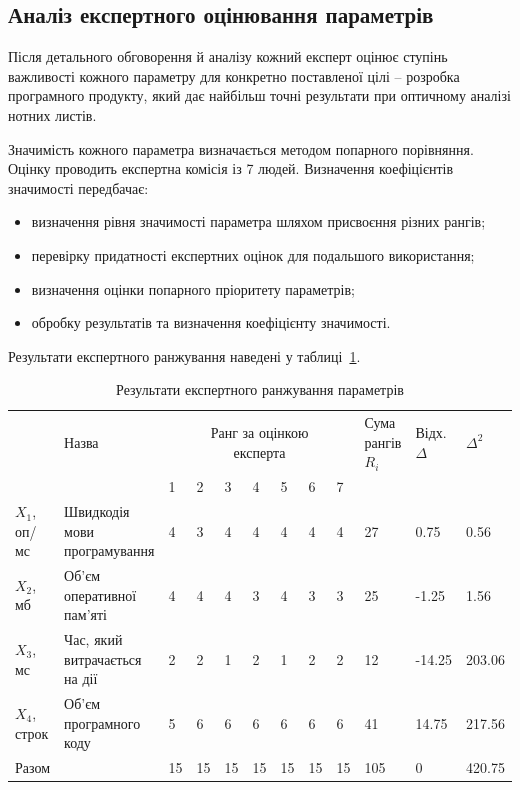 \subsection{Аналіз експертного оцінювання параметрів}
Після детального обговорення й аналізу кожний експерт оцінює ступінь важливості кожного 
параметру для конкретно поставленої цілі – розробка програмного продукту, який дає найбільш 
точні результати при оптичному аналізі нотних листів.

Значимість кожного параметра визначається методом попарного порівняння. Оцінку проводить експертна комісія із 7 людей. Визначення коефіцієнтів значимості передбачає: 
\begin{itemize}
	\item визначення рівня значимості параметра шляхом присвоєння різних рангів; 
	\item перевірку придатності експертних оцінок для подальшого використання; 
	\item визначення оцінки попарного пріоритету параметрів; 
	\item обробку результатів та визначення коефіцієнту значимості. 
\end{itemize}

Результати експертного ранжування наведені у таблиці~\ref{tab:economics:parameter_range}.

\begin{table}[H]
	\caption{Результати експертного ранжування параметрів}
	\centering
	\begin{tabular}{| m{} | p{} | m{} | m{} | m{} | m{} | m{} | m{} | m{} |	p{}|p{}|p{}|}
	\hline
	\multirow{2}{*}{\rotatebox{90}{Позначення  }} & Назва & \multicolumn{7}{c|}{\parbox[c]{0.3\textwidth}{Ранг за оцінкою\\експерта}} 	& Сума рангів $R_i$ & Відх. $\Delta$ &$\Delta^2 $ \\
	\cline{3-9}
			   & 	   & 1& 2& 3& 4& 5& 6& 7							&					&					&\\ 
	\hline
	$X_1$, оп/мс & Швидкодія мови програмування 	& 4& 3& 4& 4& 4& 4& 4& 27& 0.75 	& 0.56 \\
	\hline
	$X_2$, мб	& Об'єм оперативної пам'яті 	& 4& 4& 4& 3& 4& 3& 3& 25&-1.25	& 1.56 \\ 
	\hline
	$X_3$, мс	& Час, який витрачається на дії		& 2& 2& 1& 2& 1& 2& 2& 12&-14.25& 203.06\\
	\hline
	$X_4$, строк & Об'єм програмного коду		& 5& 6& 6& 6& 6& 6& 6& 41& 14.75& 217.56\\
	\hline
	Разом		& 								&15&15&15&15&15&15&15& 105 & 0 & 420.75\\
	\hline
	\end{tabular}
	\label{tab:economics:parameter_range}
\end{table}

